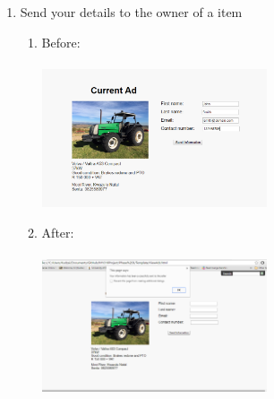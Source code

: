 \documentclass[11pt]{article}
\begin{document}
\begin{enumerate}
		\item Send your details to the owner of a item
			\begin{enumerate}
				\item Before: \\ \\
					\includegraphics[width=0.55\textwidth]{../Images/Tasks/Task10Before.png}
				\item After: \\ \\
					\includegraphics[width=0.55\textwidth]{../Images/Tasks/Task10After.png} 
			\end{enumerate}
			
	\end{enumerate}
\end{document}

